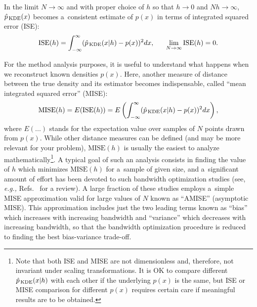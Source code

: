 \documentclass[12pt,titlepage]{article}
\newcommand{\sub}[1]{\ensuremath{_{\mbox{\scriptsize \,#1}}}}
\begin{document}
In the limit $N \rightarrow \infty$ and with proper choice of $h$ so that
$h \rightarrow 0$ and $N h \rightarrow \infty$,
$\hat{p}\sub{KDE}(x)$ becomes a~consistent
estimate of $p(x)$ in terms of integrated squared error (ISE):
\begin{equation}
\mbox{ISE}(h) = \int_{-\infty}^{\infty} (\hat{p}\sub{KDE}(x|h) - p(x))^2 dx, \ \ \ \ \ \lim_{N \rightarrow \infty} \mbox{ISE}(h) = 0.
\end{equation}

For the method analysis purposes, it is useful to understand
what happens when we reconstruct known densities $p(x)$.
Here, another measure of distance between the true
density and its estimator becomes indispensable,
called ``mean integrated squared error'' (MISE):
\begin{equation}
\mbox{MISE}(h) = E(\mbox{ISE}(h)) = E \left( \int_{-\infty}^{\infty} (\hat{p}\sub{KDE}(x|h) - p(x))^2 dx \right),
\label{eq:mise}
\end{equation}
where $E(...)$ stands for the expectation value over samples of $N$ points
drawn from $p(x)$. 
While other distance measures can be defined
(and may be more relevant for your problem),
$\mbox{MISE}(h)$ is usually
the easiest to analyze
mathematically\footnote{Note that both ISE and MISE are not dimensionless and,
therefore, not invariant under scaling transformations.
It is OK to compare different $\hat{p}\sub{KDE}(x|h)$ with each other if
the underlying $p(x)$ is the same, but ISE or MISE comparison for different $p(x)$
requires certain care if meaningful results are to be obtained.}.
A typical goal of such an analysis consists in
finding the value of $h$ which minimizes $\mbox{MISE}(h)$ for
a~sample of given size, and a~significant amount of effort
has been devoted to such bandwidth optimization studies
(see, {\it e.g.,} Refs.~\cite{ref:bwopt, ref:loaderbw} for a review).
A large fraction of these studies employs a~simple MISE approximation valid for large
values of $N$ known as ``AMISE'' (asymptotic MISE). This approximation
includes just the two leading terms known as ``bias'' which increases with
increasing bandwidth and ``variance'' which decreases with increasing bandwidth,
so that the bandwidth optimization procedure is reduced to finding
the best bias-variance trade-off.
\end{document}
